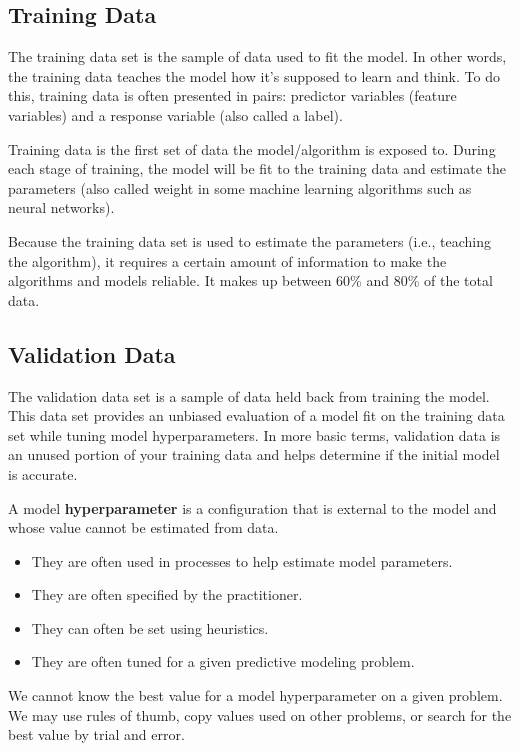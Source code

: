 \documentclass[
]{book}
\providecommand{\tightlist}{%
  \setlength{\itemsep}{0pt}\setlength{\parskip}{0pt}}
\begin{document}
\hypertarget{training-data}{%
\subsection{Training Data}\label{training-data}}

The training data set is the sample of data used to fit the model. In other words, the training data teaches the model how it's supposed to learn and think. To do this, training data is often presented in pairs: predictor variables (feature variables) and a response variable (also called a label).

Training data is the first set of data the model/algorithm is exposed to. During each stage of training, the model will be fit to the training data and estimate the parameters (also called weight in some machine learning algorithms such as neural networks).

Because the training data set is used to estimate the parameters (i.e., teaching the algorithm), it requires a certain amount of information to make the algorithms and models reliable. It makes up between 60\% and 80\% of the total data.

\hypertarget{validation-data}{%
\subsection{Validation Data}\label{validation-data}}

The validation data set is a sample of data held back from training the model. This data set provides an unbiased evaluation of a model fit on the training data set while tuning model hyperparameters. In more basic terms, validation data is an unused portion of your training data and helps determine if the initial model is accurate.

A model \textbf{hyperparameter} is a configuration that is external to the model and whose value cannot be estimated from data.

\begin{itemize}
\tightlist
\item
  They are often used in processes to help estimate model parameters.
\item
  They are often specified by the practitioner.
\item
  They can often be set using heuristics.
\item
  They are often tuned for a given predictive modeling problem.
\end{itemize}

We cannot know the best value for a model hyperparameter on a given problem. We may use rules of thumb, copy values used on other problems, or search for the best value by trial and error.
\end{document}

